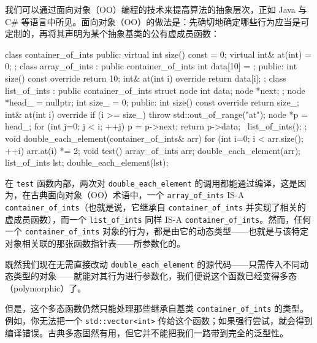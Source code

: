 我们可以通过面向对象（OO）编程的技术来提高算法的抽象层次，正如 Java 与 C\# 等语言中所见。面向对象（OO）的做法是：先确切地确定哪些行为应当是可定制的，再将其声明为某个抽象基类的公有虚成员函数：

\begin{codebox}[cpp]
    class container_of_ints {
      public:
      virtual int size() const = 0;
      virtual int& at(int) = 0;
    };
    class array_of_ints : public container_of_ints {
      int data[10] = {};
      public:
        int size() const override { return 10; }
        int& at(int i) override { return data[i]; }
    };
    class list_of_ints : public container_of_ints {
      struct node {
        int data;
        node *next;
      };
      node *head_ = nullptr;
      int size_ = 0;
      public:
       int size() const override { return size_; }
       int& at(int i) override {
        if (i >= size_) throw std::out_of_range("at");
        node *p = head_;
        for (int j=0; j < i; ++j) {
          p = p->next;
        }
        return p->data;
      }
      ~list_of_ints();
    };
    void double_each_element(container_of_ints& arr)
    {
      for (int i=0; i < arr.size(); ++i) {
        arr.at(i) *= 2;
      }
    }
    void test()
    {
      array_of_ints arr;
      double_each_element(arr);
      list_of_ints lst;
      double_each_element(lst);
    }
\end{codebox}

在 \texttt{test} 函数内部，两次对 \texttt{double\_\allowbreak{}each\_\allowbreak{}element} 的调用都能通过编译，这是因为，在古典面向对象（OO）术语中，一个 \texttt{array\_\allowbreak{}of\_\allowbreak{}ints} IS-A \texttt{container\_\allowbreak{}of\_\allowbreak{}ints}（也就是说，它继承自 \texttt{container\_\allowbreak{}of\_\allowbreak{}ints} 并实现了相关的虚成员函数），而一个 \texttt{list\_\allowbreak{}of\_\allowbreak{}ints} 同样 IS-A \texttt{container\_\allowbreak{}of\_\allowbreak{}ints}。然而，任何一个 \texttt{container\_\allowbreak{}of\_\allowbreak{}ints} 对象的行为，都是由它的动态类型——也就是与该特定对象相关联的那张函数指针表——所参数化的。

既然我们现在无需直接改动 \texttt{double\_\allowbreak{}each\_\allowbreak{}element} 的源代码——只需传入不同动态类型的对象——就能对其行为进行参数化，我们便说这个函数已经变得多态（polymorphic）了。

但是，这个多态函数仍然只能处理那些继承自基类 \texttt{container\_\allowbreak{}of\_\allowbreak{}ints} 的类型。例如，你无法把一个 \texttt{std::\allowbreak{}vector<\allowbreak{}int>\allowbreak{}} 传给这个函数；如果强行尝试，就会得到编译错误。古典多态固然有用，但它并不能把我们一路带到完全的泛型性。


